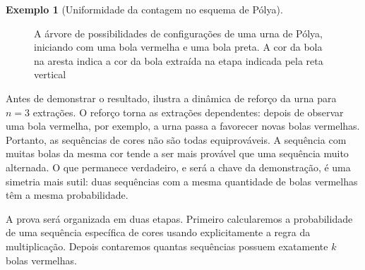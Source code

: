 \documentclass[12pt,portuguese]{article}
\theoremstyle{definition}
\newtheorem{example}[example]{Exemplo}
\begin{document}
\begin{example}[Uniformidade da contagem no esquema de Pólya]
\begin{figure}[H]
\caption{A árvore de possibilidades de configurações 
de uma urna de P\'olya, iniciando com uma bola vermelha e
uma bola preta. A cor da bola na aresta indica a cor da bola extraída na etapa indicada pela reta vertical}
\label{fig:polya-arvore}
\end{figure}

Antes de demonstrar o resultado,  ilustra a din\^amica
de refor\c{c}o da urna para $n=3$ extra\c{c}\~oes.  
O reforço torna as extrações dependentes: depois de observar uma bola vermelha, por exemplo, a urna passa a favorecer novas bolas vermelhas. Portanto, as sequências de cores não são todas equiprováveis. A sequência com muitas bolas da mesma cor tende a ser mais provável que uma sequência muito alternada. O que permanece verdadeiro, e será a chave da demonstração, é uma simetria mais sutil: duas sequências com a mesma quantidade de bolas vermelhas têm a mesma probabilidade.

A prova será organizada em duas etapas. Primeiro calcularemos a probabilidade de uma sequência específica de cores usando explicitamente a regra da multiplicação. Depois contaremos quantas sequências possuem exatamente $k$ bolas vermelhas.


\end{example}
\end{document}

